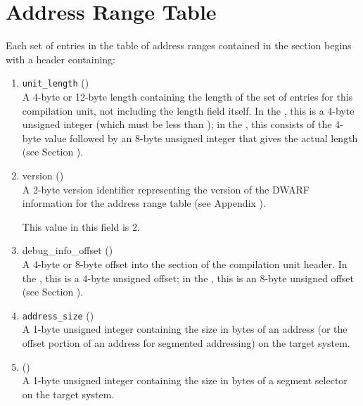 \section{Address Range Table}
\label{datarep:addrssrangetable}

Each set of entries in the table of address ranges contained
in the \dotdebugaranges{}
section begins with a header containing:
\begin{enumerate}[1. ]

\item \texttt{unit\_length} () \\
A 4-byte or 12-byte length containing the length of the
set of entries for this compilation unit, not including the
length field itself. In the \thirtytwobitdwarfformat, this is a
4-byte unsigned integer (which must be less than \xfffffffzero);
in the \sixtyfourbitdwarfformat, this consists of the 4-byte value
\wffffffff followed by an 8-byte unsigned integer that gives
the actual length 
(see Section ).

\item version (\HFTuhalf) \\
A 2-byte version identifier representing the version of the
DWARF information for the address range table
(see Appendix ).

This value in this field  is 2. 
 
\item debug\_info\_offset () \\
A 
4-byte or 8-byte offset into the 
\dotdebuginfo{} section of
the compilation unit header. In the \thirtytwobitdwarfformat,
this is a 4-byte unsigned offset; in the \sixtyfourbitdwarfformat,
this is an 8-byte unsigned offset 
(see Section ).

\item \texttt{address\_size} (\HFTubyte) \\
A 1-byte unsigned integer containing the size in bytes of an
address 
(or the offset portion of an address for segmented
addressing) on the target system.

\item \HFNsegmentselectorsize{} (\HFTubyte) \\
A 1-byte unsigned integer containing the size in bytes of a
segment selector on the target system.

\end{enumerate}

